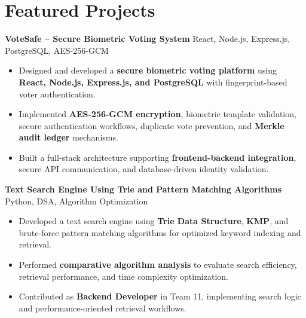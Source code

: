 \documentclass[a4paper,11pt]{article}
\newcommand{\resumeItem}[1]{
\item \small{#1 \vspace{-2pt}}
}
\newcommand{\resumeProject}[2]{
\vspace{2pt}
\textbf{#1} \hfill {\small #2}
\vspace{2pt}
}
\begin{document}
\vspace{-10pt}





\section{Featured Projects}

\resumeProject
{VoteSafe -- Secure Biometric Voting System}
{React, Node.js, Express.js, PostgreSQL, AES-256-GCM}

\begin{itemize}[leftmargin=*]

\resumeItem{Designed and developed a \textbf{secure biometric voting platform} using \textbf{React, Node.js, Express.js, and PostgreSQL} with fingerprint-based voter authentication.}

\resumeItem{Implemented \textbf{AES-256-GCM encryption}, biometric template validation, secure authentication workflows, duplicate vote prevention, and \textbf{Merkle audit ledger} mechanisms.}

\resumeItem{Built a full-stack architecture supporting \textbf{frontend-backend integration}, secure API communication, and database-driven identity validation.}

\end{itemize}

\vspace{1mm}

\resumeProject
{Text Search Engine Using Trie and Pattern Matching Algorithms}
{Python, DSA, Algorithm Optimization}

\begin{itemize}[leftmargin=*]

\resumeItem{Developed a text search engine using \textbf{Trie Data Structure}, \textbf{KMP}, and brute-force pattern matching algorithms for optimized keyword indexing and retrieval.}

\resumeItem{Performed \textbf{comparative algorithm analysis} to evaluate search efficiency, retrieval performance, and time complexity optimization.}

\resumeItem{Contributed as \textbf{Backend Developer} in Team 11, implementing search logic and performance-oriented retrieval workflows.}

\end{itemize}

\vspace{1mm}
\end{document}

